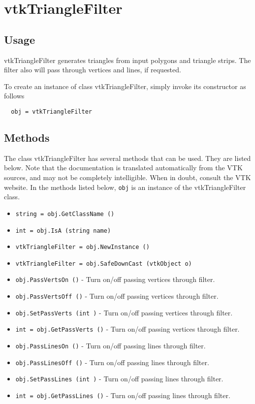 \section{vtkTriangleFilter}

\subsection{Usage}

 vtkTriangleFilter generates triangles from input polygons and triangle 
 strips. The filter also will pass through vertices and lines, if
 requested.

To create an instance of class vtkTriangleFilter, simply
invoke its constructor as follows
\begin{verbatim}
  obj = vtkTriangleFilter
\end{verbatim}
\subsection{Methods}

The class vtkTriangleFilter has several methods that can be used.
  They are listed below.
Note that the documentation is translated automatically from the VTK sources,
and may not be completely intelligible.  When in doubt, consult the VTK website.
In the methods listed below, \verb|obj| is an instance of the vtkTriangleFilter class.
\begin{itemize}
\item  \verb|string = obj.GetClassName ()|

\item  \verb|int = obj.IsA (string name)|

\item  \verb|vtkTriangleFilter = obj.NewInstance ()|

\item  \verb|vtkTriangleFilter = obj.SafeDownCast (vtkObject o)|

\item  \verb|obj.PassVertsOn ()| -  Turn on/off passing vertices through filter.

\item  \verb|obj.PassVertsOff ()| -  Turn on/off passing vertices through filter.

\item  \verb|obj.SetPassVerts (int )| -  Turn on/off passing vertices through filter.

\item  \verb|int = obj.GetPassVerts ()| -  Turn on/off passing vertices through filter.

\item  \verb|obj.PassLinesOn ()| -  Turn on/off passing lines through filter.

\item  \verb|obj.PassLinesOff ()| -  Turn on/off passing lines through filter.

\item  \verb|obj.SetPassLines (int )| -  Turn on/off passing lines through filter.

\item  \verb|int = obj.GetPassLines ()| -  Turn on/off passing lines through filter.

\end{itemize}
